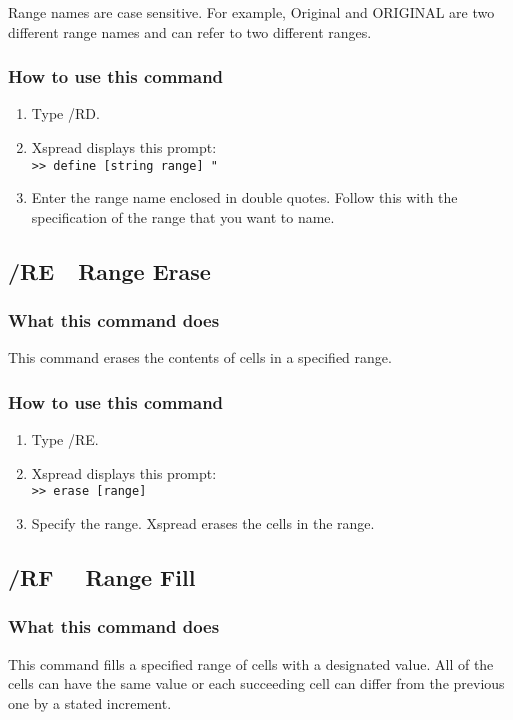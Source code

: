Range names are case sensitive.  For example, Original and ORIGINAL 
are two different range names and can refer to two different ranges.

\subsubsection*{How to use this command}
\begin{enumerate}
\item{Type /RD.}
\item{Xspread displays this prompt:\\
        {\tt >> define [string range] "}   }
\item{Enter the range name enclosed in double quotes.  Follow this with
        the specification of the range that you want to name.}
\end{enumerate}
        
\subsection*{/RE\ \      Range Erase}

\subsubsection*{What this command does}
This command erases the contents of cells in a specified range.

\subsubsection*{How to use this command}
\begin{enumerate}
\item{Type /RE.}
\item{Xspread displays this prompt:\\
        {\tt  >> erase [range]}  }
\item{Specify the range.  Xspread erases the cells in the range.}
\end{enumerate}

\subsection*{/RF \ \     Range Fill}

\subsubsection*{What this command does}
This command fills a specified range of cells with a designated value.  
All of the cells can have the same value or each succeeding cell can 
differ from the previous one by a stated increment.

